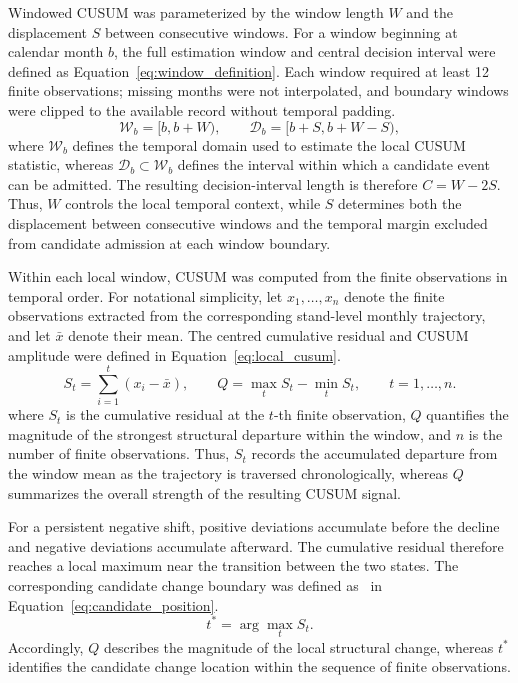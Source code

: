 Windowed CUSUM was parameterized by the window length $W$ and the displacement $S$ between consecutive windows. For a window beginning at calendar month $b$, the full estimation window and central decision interval were defined as Equation~\eqref{eq:window_definition}. Each window required at least 12 finite observations; missing months were not interpolated, and boundary windows were clipped to the available record without temporal padding.
\begin{equation}
    \label{eq:window_definition}
    \mathcal{W}_b=[b,b+W),
    \qquad
    \mathcal{D}_b=[b+S,b+W-S),
\end{equation}
where $\mathcal{W}_b$ defines the temporal domain used to estimate the local CUSUM statistic, whereas $\mathcal{D}_b\subset\mathcal{W}_b$ defines the interval within which a candidate event can be admitted. The resulting decision-interval length is therefore $C=W-2S$. Thus, $W$ controls the local temporal context, while $S$ determines both the displacement between consecutive windows and the temporal margin excluded from candidate admission at each window boundary.


Within each local window, CUSUM was computed from the finite observations in temporal order. For notational simplicity, let $x_1,\ldots,x_n$ denote the finite observations extracted from the corresponding stand-level monthly trajectory, and let $\bar{x}$ denote their mean. The centred cumulative residual and CUSUM amplitude were defined in Equation~\eqref{eq:local_cusum}.
\begin{equation}
    S_t
    =
    \sum_{i=1}^{t}(x_i-\bar{x}),
    \qquad
    Q
    =
    \max_t S_t-\min_t S_t,
    \qquad
    t=1,\ldots,n .
    \label{eq:local_cusum}
\end{equation}
where $S_t$ is the cumulative residual at the $t$-th finite observation, $Q$ quantifies the magnitude of the strongest structural departure within the window, and $n$ is the number of finite observations. Thus, $S_t$ records the accumulated departure from the window mean as the trajectory is traversed chronologically, whereas $Q$ summarizes the overall strength of the resulting CUSUM signal.

For a persistent negative shift, positive deviations accumulate before the decline and negative deviations accumulate afterward. The cumulative residual therefore reaches a local maximum near the transition between the two states. The corresponding candidate change boundary was defined as~\citep{Page1954CUSUM,Ygorra2021CuSum} in Equation~\eqref{eq:candidate_position}.
\begin{equation}
    t^{*}
    =
    \arg\max_t S_t .
    \label{eq:candidate_position}
\end{equation}
Accordingly, $Q$ describes the magnitude of the local structural change, whereas $t^{*}$ identifies the candidate change location within the sequence of finite observations.



